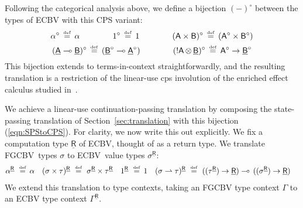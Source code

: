 \documentclass{LMCS}
\newcommand{\STA}{\sigma}
\newcommand{\STB}{\tau}
\newcommand{\EECarbret}{\comptype{\mathsf{R}}}
\newcommand{\kvar}k
\newcommand{\pto}{\rightharpoonup}
\newcommand{\comptype}[1]{\underline{#1}}
\newcommand{\VconstA}{\alpha}
\newcommand{\VA}{\mathsf{A}}
\newcommand{\VB}{\mathsf{B}}
\newcommand{\CA}{\comptype{\mathsf{A}}}
\newcommand{\CB}{\comptype{\mathsf{B}}}
\newcommand{\tensor}{\otimes}
\newcommand{\ltensortype}[2]{{!} #1 \, {\tensor} \, #2}
\newcommand{\lpowertype}[2]{#1\to #2}
\newcommand{\prodtype}{\times}
\newcommand{\lfun}{\multimap}
\newcommand{\FGCBV}{FGCBV}
\newcommand{\ECBV}{ECBV}
\newcommand{\CBVtoEEC}[1]{#1^{\circ}}
\newcommand{\CBVtoEECbase}[2]{#2^{#1}}
\newcommand{\defeq}{\mathrel{\,\stackrel{\mbox{\tiny{$\mathrm{def}$}}}=\,}}
\begin{document}
Following the categorical analysis above, 
we define a bijection $(-)^\circ$ between the types of
ECBV with this CPS variant:
\begin{equation}\label{eqn:SPStoCPS}\begin{gathered}
\alpha^\circ\defeq \alpha\qquad \qquad 
1^\circ \defeq 1\qquad\qquad 
(\VA\times\VB)^\circ \defeq (\VA^\circ\times \VB^\circ)
\\
(\CA\lpop\CB)^\circ \defeq (\CB^\circ\lpop \CA^\circ)
\qquad\qquad 
(\ltensortype \VA\CB)^\circ \defeq \lpowertype{\VA^\circ}{\CB^\circ}
\end{gathered}\end{equation}
This bijection extends to terms-in-context straightforwardly, and the resulting 
translation is a restriction of the linear-use cps involution of 
the enriched effect calculus studied in~\cite{Mogelberg:fossacs:10,EEC:LCPS:journal}.

We achieve a linear-use continuation-passing translation
by composing the state-passing translation of Section~\ref{sec:translation}
with this bijection (\ref{eqn:SPStoCPS}).
For clarity, we now write this out explicitly.
We fix a computation type $\EECarbret$ of \ECBV,
thought of as a return type.
\newcommand{\lneg}[1]{\lpowertype {#1}\EECarbret}\renewcommand{\CBVtoEEC}{\CBVtoEECbase\EECarbret}\renewcommand{\CBVtoEECV}{\CBVtoEECbase \EECarbret}\renewcommand{\CBVtoEECP}[1]{\CBVtoEECbase \EECarbret{#1}_\kvar}We translate \FGCBV\ types $\sigma$ to \ECBV\ value types
$\CBVtoEEC\sigma$:
\begin{align*}
\CBVtoEEC{\alpha} & \, \defeq \VconstA &
\CBVtoEEC{(\STA \times \STB)} & \, \defeq\, 
\CBVtoEEC{\STA} \prodtype \CBVtoEEC{\STB} &
\CBVtoEEC{1} & \, \defeq \valone&
\CBVtoEEC{(\STA \pto \STB)} & \, \defeq \, 
(\lneg{(\CBVtoEEC{\STB})}) \lfun \, (\lneg{(\CBVtoEEC{\STA})})
\end{align*}
We extend this translation to type contexts,
taking an FGCBV type context $\Gamma$ to an
ECBV type context $\CBVtoEEC\Gamma$.
\end{document}

